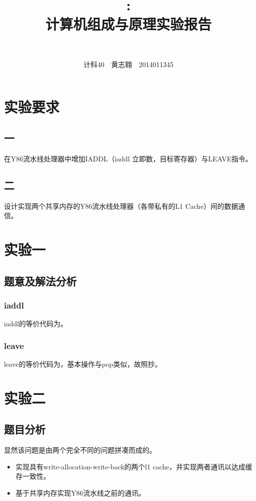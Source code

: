 \documentclass{article}
\title{\textmd{\bf \Class: \Title}\\\normalsize\vspace{0.1in}}
\author{\textbf{\StudentName}\ \ \StudentNumber}
\theoremstyle{plain} \newtheorem{theorem}{常识}[section]
\theoremstyle{plain} \newtheorem{lizi}{例}[section]
\begin{document}
\title{计算机组成与原理实验报告}
\author{计科40~~黄志翱~~2014011345}
\maketitle

\section{实验要求}
\subsection{一}
在Y86流水线处理器中增加IADDL（iaddl 立即数，目标寄存器）与LEAVE指令。

\subsection{二}
设计实现两个共享内存的Y86流水线处理器（各带私有的L1 Cache）间的数据通信。

\section{实验一}
\subsection{题意及解法分析}
\subsubsection{iaddl}
iaddl的等价代码为。

\subsubsection{leave}
leave的等价代码为，基本操作与pop类似，故照抄。

\section{实验二}
\subsection{题目分析}
显然该问题是由两个完全不同的问题拼凑而成的。

\begin{itemize}
    \item 实现具有write-allocation-write-back的两个l1 cache，并实现两者通讯以达成缓存一致性。
    \item 基于共享内存实现Y86流水线之前的通讯。
\end{itemize}
\end{document}

